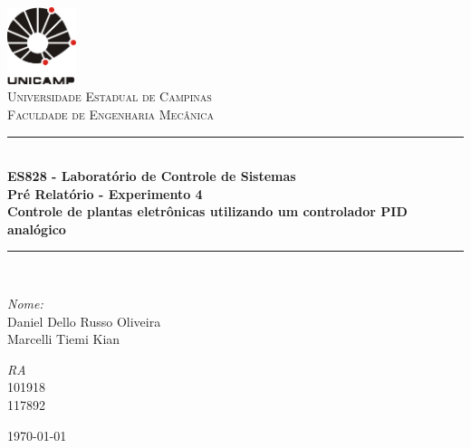 
\begin{titlepage}
\begin{center}

\newcommand{\HRule}{\rule{\linewidth}{0.5mm}}
\includegraphics[width=0.15\textwidth]{logoUnicamp}~\\[1cm]

\textsc{\LARGE Universidade Estadual de Campinas}\\[1.5cm]

\textsc{\Large Faculdade de Engenharia Mecânica}\\[0.5cm]

\HRule \\[0.4cm]
{ \huge \bfseries ES828 - Laboratório de Controle de Sistemas\\ \vspace{1cm} Pré Relatório - Experimento 4 \\
\Large{Controle de plantas eletrônicas utilizando um controlador PID analógico} \\[0.4cm] }

\HRule \\[1.5cm]

\begin{minipage}{0.6\textwidth}
\begin{flushleft} \large
\emph{Nome:}\\
Daniel Dello Russo Oliveira\\ Marcelli Tiemi Kian
\end{flushleft}
\end{minipage}
\begin{minipage}{0.2\textwidth}
\begin{flushright} \large
\emph{RA}\\ 101918\\
117892
\end{flushright}
\end{minipage}

\vfill

{\large \today}

\end{center}
\end{titlepage}
